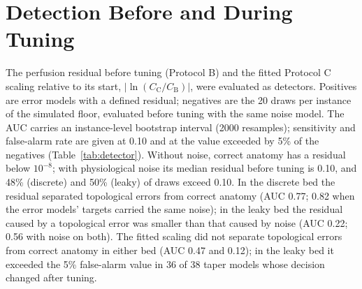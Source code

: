 \documentclass[journal,twoside,web,onecolumn]{ieeecolor}
\begin{document}
\section{Detection Before and During Tuning}\label{sec:detector}
The perfusion residual before tuning (Protocol B) and the fitted Protocol C scaling relative to its start,
$|\ln(C_\mathrm{C}/C_\mathrm{B})|$, were evaluated as detectors. Positives are error models with a defined residual;
negatives are the 20 draws per instance of the simulated floor, evaluated before tuning with the same noise model. The
AUC carries an instance-level bootstrap interval (2000 resamples); sensitivity and false-alarm rate are given at 0.10
and at the value exceeded by 5\% of the negatives (Table~\ref{tab:detector}). Without noise, correct anatomy has a
residual below $10^{-8}$; with physiological noise its median residual before tuning is 0.10, and 48\% (discrete)
and 50\% (leaky) of draws exceed 0.10. In the discrete bed the residual separated topological errors from correct
anatomy (AUC 0.77; 0.82 when the error models' targets carried the same noise); in the leaky bed the residual caused
by a topological error was smaller than that caused by noise (AUC 0.22; 0.56 with noise on both). The fitted scaling
did not separate topological errors from correct anatomy in either bed (AUC 0.47 and 0.12); in the leaky bed it
exceeded the 5\% false-alarm value in 36 of 38 taper models whose decision changed after tuning.
\end{document}
